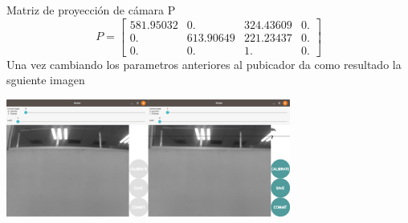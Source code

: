 Matriz de proyección de cámara P
\begin{equation}
	P=
	\begin{bmatrix}
		581.95032 & 0.        & 324.43609 & 0. \\
		0.        & 613.90649 & 221.23437 & 0. \\
		0.        & 0.        & 1.        & 0.
	\end{bmatrix}
\end{equation}
Una vez cambiando los parametros anteriores al pubicador da como resultado la sguiente imagen
\begin{center}
	\includegraphics[width=0.7\textwidth]{Contenido/Cuerpo/Capitulo4/Fig10.eps}
	\label{Fig1}
\end{center}



